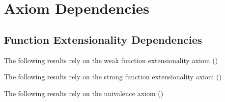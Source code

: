 \chapter{Axiom Dependencies}

\section{Function Extensionality Dependencies}\label{FE-dependencies}

The following results rely on the weak function extensionality axiom (\WE)

\vspace{-0.7\parskip}
{\small
\printindex[we]
}

The following results rely on the strong function extensionality axiom (\FE)

\vspace{-0.7\parskip}
{\small
\printindex[fe]
}

The following results rely on the univalence axiom (\UA)

\vspace{-0.7\parskip}
{\small
\printindex[ua]
}
